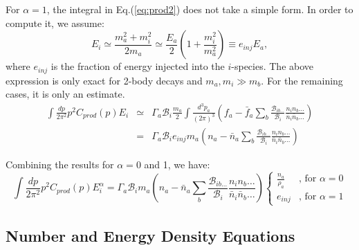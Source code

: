 \documentclass[preprint,notoc]{JHEP3}
\begin{document}
For $\alpha = 1$, the integral in Eq.(\ref{eq:prod2}) does not take a simple
form. In order to compute it, we assume:
\begin{equation}
E_i \simeq \frac{m_a^2 + m_i^2}{2 m_a} \simeq \frac{E_a}{2}\left(1+\frac{m_i^2}{m_a^2}\right) \equiv e_{inj} E_a,
\end{equation}
where $e_{inj}$ is the fraction of energy injected into the $i$-species.
The above expression is only exact for 2-body decays and $m_a,m_i \gg
m_b$. For the remaining cases, it is only an estimate.
\begin{eqnarray}
\int \frac{dp}{2 \pi^2} p^2 C_{prod}(p) E_i & \simeq & 
\Gamma_a \mathcal{B}_{i}  \frac{m_a}{2} \int \frac{d^3 p_a}{(2
\pi)^3} \left(f_a - \bar{f}_a \sum_b
\frac{\mathcal{B}_{ib\ldots}}{\mathcal{B}_{i}}
 \frac{n_i n_b \ldots}{\bar{n}_i \bar{n}_b \ldots} \right)
\nonumber
\\
& = & \Gamma_a \mathcal{B}_{i}  e_{inj} m_a \left( n_a -
\bar{n}_a \sum_b \frac{\mathcal{B}_{ib\ldots}}{\mathcal{B}_{i}} \frac{n_i n_b
\ldots}{\bar{n}_i \bar{n}_b \ldots} \right)
\end{eqnarray}


Combining the results for $\alpha = 0$ and 1, we have:
\begin{equation}
\int \frac{dp}{2 \pi^2} p^2 C_{prod}(p) E_i^{\alpha} = 
\Gamma_a \mathcal{B}_{i} m_a  \left( n_a - \bar{n}_a
\sum_b \frac{\mathcal{B}_{ib\ldots}}{\mathcal{B}_{i}} \frac{n_i n_b
\ldots}{\bar{n}_i
\bar{n}_b \ldots} \right) \left\{ \begin{array}{ll}  \frac{n_a}{\rho_a}  & \mbox{, for $\alpha = 0$} 
\\
 e_{inj}  & \mbox{, for $\alpha = 1$}
\end{array} \right. \label{eq:prodfin}
\end{equation}

\subsection{Number and Energy Density Equations}
\end{document}
